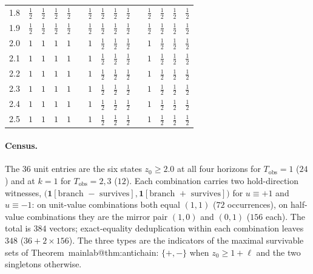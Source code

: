 \documentclass[11pt,a4paper]{article}
\makeatletter
\theoremstyle{plain}
\theoremstyle{definition}
\theoremstyle{remark}
\newcommand{\Tobs}{T_{\mathrm{obs}}}
\newcommand{\ind}[1]{\mathbf{1}[#1]}
\newcommand{\mref}[1]{\csname mainlab@#1\endcsname}
\makeatother
\begin{document}
\begin{table}[h]
\begin{tabular}{@{}l cccc c cccc c cccc@{}}
1.8 & $\tfrac{1}{2}$ & $\tfrac{1}{2}$ & $\tfrac{1}{2}$ & $\tfrac{1}{2}$ & & $\tfrac{1}{2}$ & $\tfrac{1}{2}$ & $\tfrac{1}{2}$ & $\tfrac{1}{2}$ & & $\tfrac{1}{2}$ & $\tfrac{1}{2}$ & $\tfrac{1}{2}$ & $\tfrac{1}{2}$\\
1.9 & $\tfrac{1}{2}$ & $\tfrac{1}{2}$ & $\tfrac{1}{2}$ & $\tfrac{1}{2}$ & & $\tfrac{1}{2}$ & $\tfrac{1}{2}$ & $\tfrac{1}{2}$ & $\tfrac{1}{2}$ & & $\tfrac{1}{2}$ & $\tfrac{1}{2}$ & $\tfrac{1}{2}$ & $\tfrac{1}{2}$\\
2.0 & $1$ & $1$ & $1$ & $1$ & & $1$ & $\tfrac{1}{2}$ & $\tfrac{1}{2}$ & $\tfrac{1}{2}$ & & $1$ & $\tfrac{1}{2}$ & $\tfrac{1}{2}$ & $\tfrac{1}{2}$\\
2.1 & $1$ & $1$ & $1$ & $1$ & & $1$ & $\tfrac{1}{2}$ & $\tfrac{1}{2}$ & $\tfrac{1}{2}$ & & $1$ & $\tfrac{1}{2}$ & $\tfrac{1}{2}$ & $\tfrac{1}{2}$\\
2.2 & $1$ & $1$ & $1$ & $1$ & & $1$ & $\tfrac{1}{2}$ & $\tfrac{1}{2}$ & $\tfrac{1}{2}$ & & $1$ & $\tfrac{1}{2}$ & $\tfrac{1}{2}$ & $\tfrac{1}{2}$\\
2.3 & $1$ & $1$ & $1$ & $1$ & & $1$ & $\tfrac{1}{2}$ & $\tfrac{1}{2}$ & $\tfrac{1}{2}$ & & $1$ & $\tfrac{1}{2}$ & $\tfrac{1}{2}$ & $\tfrac{1}{2}$\\
2.4 & $1$ & $1$ & $1$ & $1$ & & $1$ & $\tfrac{1}{2}$ & $\tfrac{1}{2}$ & $\tfrac{1}{2}$ & & $1$ & $\tfrac{1}{2}$ & $\tfrac{1}{2}$ & $\tfrac{1}{2}$\\
2.5 & $1$ & $1$ & $1$ & $1$ & & $1$ & $\tfrac{1}{2}$ & $\tfrac{1}{2}$ & $\tfrac{1}{2}$ & & $1$ & $\tfrac{1}{2}$ & $\tfrac{1}{2}$ & $\tfrac{1}{2}$\\
\bottomrule
\end{tabular}
\end{table}

\paragraph{Census.} The $36$ unit entries are the six states $z_0\ge2.0$ at all four horizons for $\Tobs=1$ ($24$) and at $k=1$ for $\Tobs=2,3$ ($12$). Each combination carries two hold-direction witnesses, $\bigl(\ind{\text{branch }-\text{ survives}},\ind{\text{branch }+\text{ survives}}\bigr)$ for $u\equiv+1$ and $u\equiv-1$: on unit-value combinations both equal $(1,1)$ ($72$ occurrences), on half-value combinations they are the mirror pair $(1,0)$ and $(0,1)$ ($156$ each). The total is $384$ vectors; exact-equality deduplication within each combination leaves $348$ ($36+2\times156$). The three types are the indicators of the maximal survivable sets of Theorem~\mref{thm:antichain}: $\{+,-\}$ when $z_0\ge1+\ell$ and the two singletons otherwise.
\end{document}
